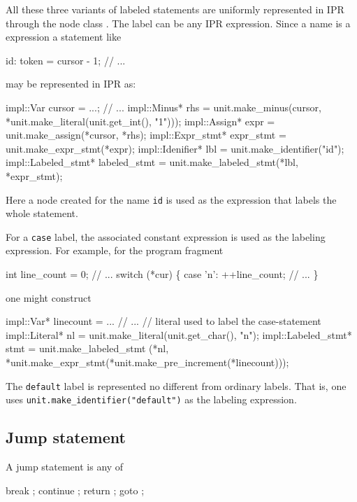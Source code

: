 \documentclass[a4paper,12pt]{article}
\begin{document}
All these three variants of labeled statements are uniformly represented in
IPR through the node class .  The label can be any
IPR expression.  Since a name is a expression a statement like 
\begin{Program}
  id:
     token = cursor - 1;
     // ...
\end{Program}
may be represented in IPR as:
\begin{Program}
  impl::Var cursor = ...;
  // ...
  impl::Minus* rhs = unit.make_minus(cursor, 
                                     *unit.make_literal(unit.get_int(), "1")));
  impl::Assign* expr = unit.make_assign(*cursor, *rhs);
  impl::Expr_stmt* expr_stmt = unit.make_expr_stmt(*expr);
  impl::Idenifier* lbl = unit.make_identifier("id");
  impl::Labeled_stmt* labeled_stmt = unit.make_labeled_stmt(*lbl, *expr_stmt);
\end{Program}
Here a node created for the name \texttt{id} is used as the expression
that labels the whole statement.

For a \texttt{case} label, the associated constant expression is used as the
labeling expression.  For example, for the program fragment
\begin{Program}
  int line_count = 0;
  // ...
  switch (*cur) \{
    case '{\bslash}n':
       ++line_count;
       // ...
  \}
\end{Program}
one might construct
\begin{Program}
  impl::Var* linecount = ...
  // ...
  // literal used to label the case-statement
  impl::Literal* nl = unit.make_literal(unit.get_char(), "{\bslash\bslash}n");
  impl::Labeled_stmt* stmt = unit.make_labeled_stmt
     (*nl, *unit.make_expr_stmt(*unit.make_pre_increment(*linecount)));
\end{Program}

The \texttt{default} label is represented no different from ordinary labels.
That is, one uses \verb=unit.make_identifier("default")= as the labeling
expression. 


\subsection{Jump statement}
\label{sec:stmt.jump}

A jump statement is any of
\begin{Grammar}
      break ;
      continue ;
      return  ;
      goto  ;
\end{Grammar}
\end{document}
